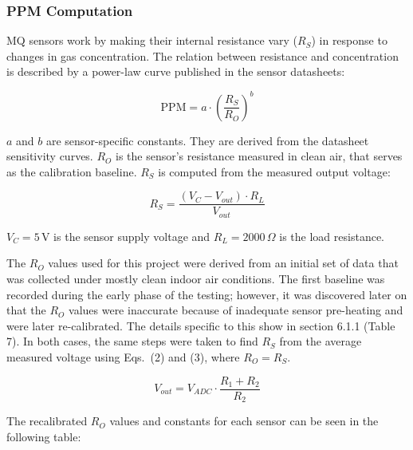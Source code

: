 \subsubsection{PPM Computation}
\label{subsubsec:ppm}

MQ sensors work by making their internal resistance vary ($R_S$) in response to changes in gas
concentration. The relation between resistance and concentration is described by a power-law
curve published in the sensor datasheets:

\begin{equation}
  \mathrm{PPM} = a \cdot \left(\frac{R_S}{R_O}\right)^b \tag{1}
  \label{eq:ppm}
\end{equation}

$a$ and $b$ are sensor-specific constants. They are derived from the datasheet sensitivity
curves. $R_O$ is the sensor's resistance measured in clean air, that serves as the calibration
baseline. $R_S$ is computed from the measured output voltage:

\begin{equation}
  R_S = \frac{(V_C - V_{out}) \cdot R_L}{V_{out}} \tag{2}
  \label{eq:rs}
\end{equation}

$V_C = 5\,\text{V}$ is the sensor supply voltage and $R_L = 2000\,\Omega$ is the load
resistance.

The $R_O$ values used for this project were derived from an initial set of data that was
collected under mostly clean indoor air conditions. The first baseline was recorded during the
early phase of the testing; however, it was discovered later on that the $R_O$ values were
inaccurate because of inadequate sensor pre-heating and were later re-calibrated. The details
specific to this show in section 6.1.1 (Table 7). In both cases, the same steps were taken to
find $R_S$ from the average measured voltage using Eqs.\ (2) and (3), where $R_O = R_S$.

\begin{equation}
  V_{out} = V_{ADC} \cdot \frac{R_1 + R_2}{R_2} \tag{3}
  \label{eq:vdivider}
\end{equation}

The recalibrated $R_O$ values and constants for each sensor can be seen in the following table:

